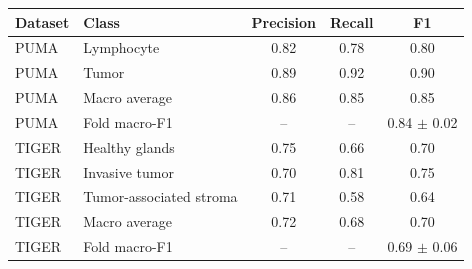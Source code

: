 \begin{tabular}{llccc}
\toprule
Dataset & Class & Precision & Recall & F1 \\
\midrule
PUMA & Lymphocyte & 0.82 & 0.78 & 0.80 \\
PUMA & Tumor & 0.89 & 0.92 & 0.90 \\
PUMA & Macro average & 0.86 & 0.85 & 0.85 \\
PUMA & Fold macro-F1 & -- & -- & 0.84 $\pm$ 0.02 \\
TIGER & Healthy glands & 0.75 & 0.66 & 0.70 \\
TIGER & Invasive tumor & 0.70 & 0.81 & 0.75 \\
TIGER & Tumor-associated stroma & 0.71 & 0.58 & 0.64 \\
TIGER & Macro average & 0.72 & 0.68 & 0.70 \\
TIGER & Fold macro-F1 & -- & -- & 0.69 $\pm$ 0.06 \\
\bottomrule
\end{tabular}
